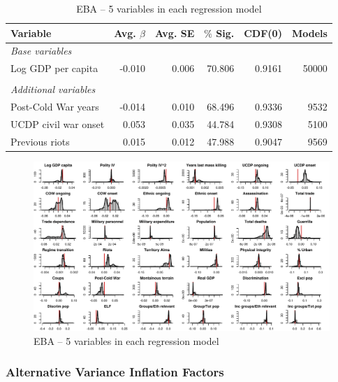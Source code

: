 \vspace{1cm}

\begin{table}[!htpb]
\centering
\begin{tabular}{lrrrrr}
\hline
\textbf{Variable} & \textbf{Avg. $\beta$} & \textbf{Avg. SE} & \textbf{$\%$ Sig.} & \textbf{CDF(0)} & \textbf{Models} \\ \hline
\textit{Base variables} &  &  &  &  &  \\
Log GDP per capita & -0.010 & 0.006 & 70.806 & 0.9161 & 50000 \\
 &  &  &  &  &  \\
\textit{Additional variables} &  &  &  &  &  \\
Post-Cold War years & -0.014 & 0.010 & 68.496 & 0.9336 & 9532 \\
UCDP civil war onset & 0.053 & 0.035 & 44.784 & 0.9308 & 5100 \\
Previous riots & 0.015 & 0.012 & 47.988 & 0.9047 & 9569 \\\hline
\end{tabular}
\caption{EBA -- 5 variables in each regression model}
\label{tab:mk-5vars}
\end{table}

\clearpage
\begin{figure}
    \centering
    \includegraphics[width=\textwidth]{images/mk-5vars.pdf}
    \caption{EBA -- 5 variables in each regression model}
    \label{fig:hist-mk-5vars}
\end{figure}
\clearpage

\subsubsection{Alternative Variance Inflation Factors}

